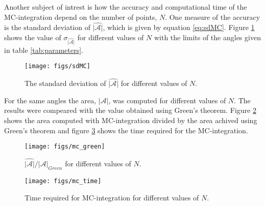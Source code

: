 Another subject of intrest is how the accuracy and computational time of the MC-integration depend on the number of points, $N$. One measure of the accuracy is the standard deviation of $\hat{|\mathcal{A}|}$, which is given by equation \eqref{eq:sdMC}. Figure \ref{sdMC} shows the value of $\sigma_{\hat{|\mathcal{A}|}}$ for different values of $N$ with the limits of the angles given in table \ref{tab:parameters}.

\begin{figure}[!ht]
\centering
\texttt{[image: figs/sdMC]}
\caption{The standard deviation of $\hat{|\mathcal{A}|}$ for different values of $N$. \label{sdMC}}
\end{figure}

For the same angles the area, $|\mathcal{A}|$, was computed for different values of $N$. The results were compeared with the value obtained using Green's theorem. Figure \ref{mc_green} shows the area computed with MC-integration divided by the area achived using Green's theorem and figure \ref{mc_time} shows the time required for the MC-integration.

\begin{figure}[!ht]
\centering
\texttt{[image: figs/mc\_green]}
\caption{$\hat{|\mathcal{A}|}/|\mathcal{A}|_{Green}$ for different values of $N$. \label{mc_green}}
\end{figure}

\begin{figure}[!ht]
\centering
\texttt{[image: figs/mc\_time]}
\caption{Time required for MC-integration for different values of $N$.\label{mc_time} }
\end{figure}
%
%
%
%
%



